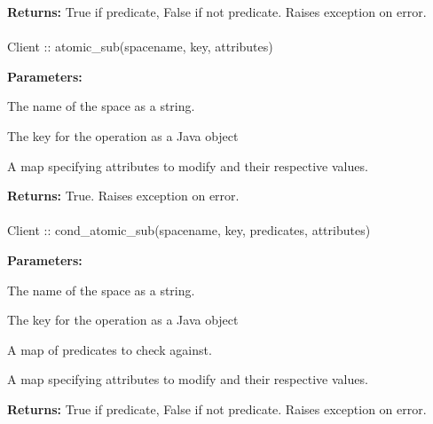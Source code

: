 \noindent\textbf{Returns:}
True if predicate, False if not predicate.  Raises exception on error.

\paragraph{}
\label{api:java:atomic_sub}
\begin{javacode}
Client :: atomic_sub(spacename, key, attributes)
\end{javacode}
\funcdesc 

\noindent\textbf{Parameters:}
\begin{description}[labelindent=\widthof{{\code{attributes}}},leftmargin=*,noitemsep,nolistsep,align=right]
\item[\code{spacename}] The name of the space as a string.
\item[\code{key}] The key for the operation as a Java object
\item[\code{attributes}] A map specifying attributes to modify and their respective values.
\end{description}

\noindent\textbf{Returns:}
True.  Raises exception on error.

\paragraph{}
\label{api:java:cond_atomic_sub}
\begin{javacode}
Client :: cond_atomic_sub(spacename, key, predicates, attributes)
\end{javacode}
\funcdesc 

\noindent\textbf{Parameters:}
\begin{description}[labelindent=\widthof{{\code{predicates}}},leftmargin=*,noitemsep,nolistsep,align=right]
\item[\code{spacename}] The name of the space as a string.
\item[\code{key}] The key for the operation as a Java object
\item[\code{predicates}] A map of predicates to check against.
\item[\code{attributes}] A map specifying attributes to modify and their respective values.
\end{description}

\noindent\textbf{Returns:}
True if predicate, False if not predicate.  Raises exception on error.

